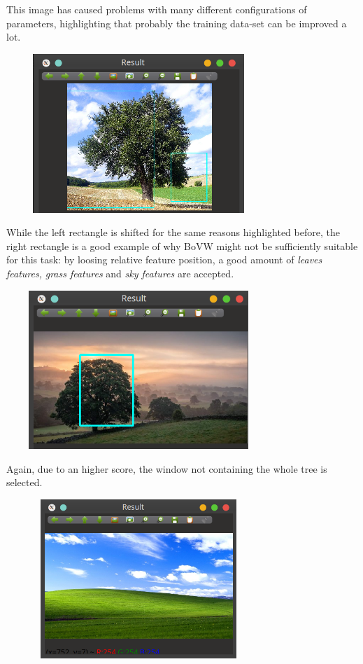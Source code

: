 \documentclass[]{report}
\begin{document}
This image has caused problems with many different configurations of parameters, highlighting that probably the training data-set can be improved a lot.

\vspace{0.5cm}
\begin{center}
	\includegraphics[width=10cm,height=6cm]{img/final/4}
\end{center}
\vspace{0.5cm}

While the left rectangle is shifted for the same reasons highlighted before, the right rectangle is a good example of why BoVW might not be sufficiently suitable for this task: by loosing relative feature position, a good amount of \textit{leaves features,} \textit{grass features} and \textit{sky features} are accepted.

\vspace{0.5cm}
\begin{center}
	\includegraphics[width=10cm,height=6cm]{img/final/5}
\end{center}
\vspace{0.5cm}

Again, due to an higher score, the window not containing the whole tree is selected.

\vspace{0.5cm}
\begin{center}
	\includegraphics[width=10cm,height=6cm]{img/final/6}
\end{center}
\vspace{0.5cm}
\end{document}
